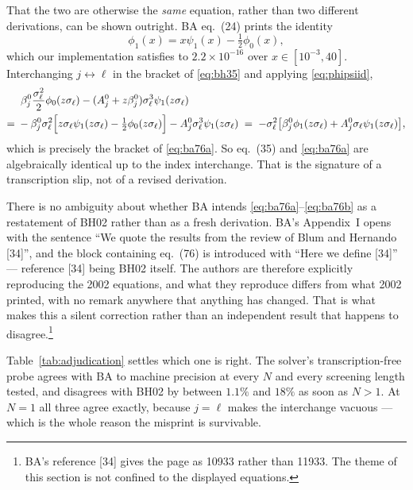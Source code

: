 \documentclass[11pt,a4paper]{article}
\newcommand{\eqBH}[1]{eq.~(#1)}
\begin{document}
That the two are otherwise the \emph{same} equation, rather than two different
derivations, can be shown outright. BA \eqBH{24} prints the identity
\begin{equation}
  \phi_1(x)=x\psi_1(x)-\tfrac12\phi_0(x),
  \label{eq:phipsiid}
\end{equation}
which our implementation satisfies to $2.2\times10^{-16}$ over
$x\in[10^{-3},40]$. Interchanging $j\leftrightarrow\ell$ in the bracket of
\eqref{eq:bh35} and applying \eqref{eq:phipsiid},
\begin{align}
  &\;\beta^0_j\frac{\sigma_\ell^2}{2}\phi_0(z\sigma_\ell)
   -(A^0_j+z\beta^0_j)\sigma_\ell^3\psi_1(z\sigma_\ell)\notag\\
  ={}&-\beta^0_j\sigma_\ell^2\Bigl[z\sigma_\ell\psi_1(z\sigma_\ell)
       -\tfrac12\phi_0(z\sigma_\ell)\Bigr]-A^0_j\sigma_\ell^3\psi_1(z\sigma_\ell)
  \;=\;-\sigma_\ell^2\bigl[\beta^0_j\phi_1(z\sigma_\ell)
       +A^0_j\sigma_\ell\psi_1(z\sigma_\ell)\bigr],
\end{align}
which is precisely the bracket of \eqref{eq:ba76a}. So \eqBH{35} and
\eqref{eq:ba76a} are algebraically identical up to the index interchange. That
is the signature of a transcription slip, not of a revised derivation.

There is no ambiguity about whether BA intends \eqref{eq:ba76a}--\eqref{eq:ba76b}
as a restatement of BH02 rather than as a fresh derivation. BA's Appendix~I
opens with the sentence ``We quote the results from the review of Blum and
Hernando [34]'', and the block containing \eqBH{76} is introduced with ``Here
we define [34]'' --- reference [34] being BH02 itself. The authors are
therefore explicitly reproducing the 2002 equations, and what they reproduce
differs from what 2002 printed, with no remark anywhere that anything has
changed. That is what makes this a silent correction rather than an independent
result that happens to disagree.\footnote{BA's reference [34] gives the page as
10933 rather than 11933. The theme of this section is not confined to the
displayed equations.}

Table~\ref{tab:adjudication} settles which one is right. The solver's
transcription-free probe agrees with BA to machine precision at every $N$ and
every screening length tested, and disagrees with BH02 by between $1.1\%$ and
$18\%$ as soon as $N>1$. At $N=1$ all three agree exactly, because $j=\ell$
makes the interchange vacuous --- which is the whole reason the misprint is
survivable.
\end{document}
